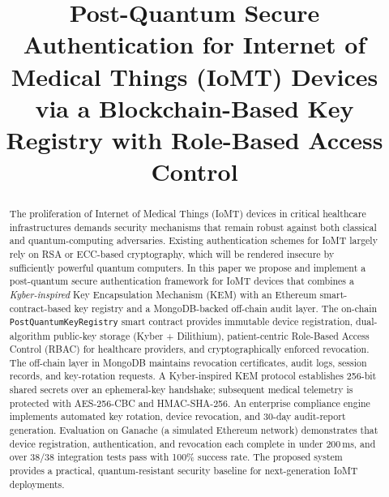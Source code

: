 \documentclass[conference]{IEEEtran}
\begin{document}
\title{Post-Quantum Secure Authentication for Internet of Medical Things (IoMT)
Devices via a Blockchain-Based Key Registry with Role-Based Access Control}

\author{
}

\maketitle

\begin{abstract}
The proliferation of Internet of Medical Things (IoMT) devices in critical healthcare
infrastructures demands security mechanisms that remain robust against both classical
and quantum-computing adversaries. Existing authentication schemes for IoMT largely
rely on RSA or ECC-based cryptography, which will be rendered insecure by sufficiently
powerful quantum computers. In this paper we propose and implement a post-quantum
secure authentication framework for IoMT devices that combines a \emph{Kyber-inspired}
Key Encapsulation Mechanism (KEM) with an Ethereum smart-contract-based key registry
and a MongoDB-backed off-chain audit layer. The on-chain \texttt{PostQuantumKeyRegistry}
smart contract provides immutable device registration, dual-algorithm public-key storage
(Kyber + Dilithium), patient-centric Role-Based Access Control (RBAC) for healthcare
providers, and cryptographically enforced revocation. The off-chain layer in MongoDB
maintains revocation certificates, audit logs, session records, and key-rotation
requests. A Kyber-inspired KEM protocol establishes 256-bit shared secrets over an
ephemeral-key handshake; subsequent medical telemetry is protected with AES-256-CBC and
HMAC-SHA-256. An enterprise compliance engine implements automated key rotation, device
revocation, and 30-day audit-report generation. Evaluation on Ganache (a simulated
Ethereum network) demonstrates that device registration, authentication, and revocation
each complete in under 200\,ms, and over 38/38 integration tests pass with 100\% success
rate. The proposed system provides a practical, quantum-resistant security baseline for
next-generation IoMT deployments.
\end{abstract}
\end{document}
